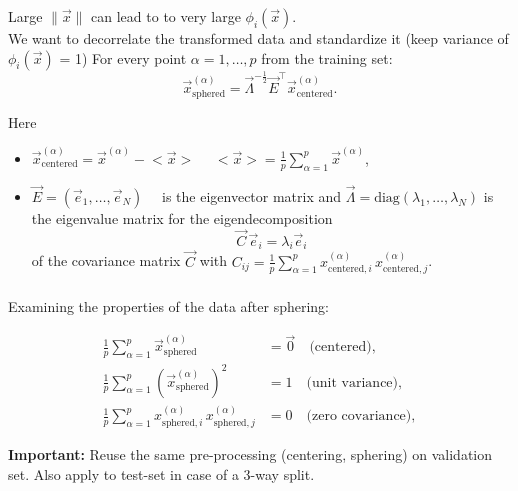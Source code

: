 \begin{frame}\frametitle{\subsecname}

Large $\lVert \vec x \rVert$ can lead to to very large $\phi_i(\vec x)$. \\

We want to decorrelate the transformed data and standardize it (keep variance of $\phi_i(\vec x)$ = 1)
For every point $\alpha=1,\ldots,p$ from the training set:
\begin{equation}
\vec x^{(\alpha)}_\mathrm{sphered} = \vec \Lambda^{-\frac{1}{2}} \vec E^\top \vec x^{(\alpha)}_\mathrm{centered}.
\end{equation}

Here 
\begin{itemize}
 \item[]   
$\vec x^{(\alpha)}_\mathrm{centered} = \vec x^{(\alpha)} - \big<{\vec x}\big>\quad$ 
$\big<{\vec x}\big> = \frac{1}{p} \sum_{\alpha=1}^p \vec x^{(\alpha)}$,
\item[] $\vec E = (\vec e_1, \dots, \vec e_N)\quad$ is the eigenvector matrix and $\vec \Lambda = \mathrm{diag}(\lambda_1, \dots, \lambda_N)$ is the eigenvalue matrix for the eigendecomposition 
$$
\vec C \, \vec e_i = \lambda_i \vec e_i
$$ of the covariance matrix $\vec C$ with $C_{ij} = \frac{1}{p} \sum_{\alpha=1}^p x^{(\alpha)}_{\mathrm{centered},i} \, x^{(\alpha)}_{\mathrm{centered},j}$.
\end{itemize}


\end{frame}

\begin{frame}\frametitle{\subsecname}

Examining the properties of the data after sphering:

\begin{align}
\frac{1}{p}  \sum_{\alpha=1}^{p} \vec x^{(\alpha)}_\mathrm{sphered} &= \vec 0 \quad \text{(centered)},\\
\frac{1}{p}  \sum_{\alpha=1}^{p} (\vec x^{(\alpha)}_\mathrm{sphered})^{2} &=  1 \quad \text{(unit variance)},\\
\frac{1}{p}  \sum_{\alpha=1}^{p} x^{(\alpha)}_{\mathrm{sphered},i} \, x^{(\alpha)}_{\mathrm{sphered},j} &= 0 \quad \text{(zero covariance)},
\end{align}

\textbf{Important:} Reuse the same pre-processing (centering, sphering) on validation set. 
Also apply to test-set in case of a 3-way split.

\end{frame}

